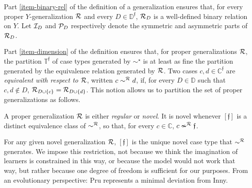 \documentclass[12pt,a4paper,twoside]{article}
\newcommand{\novel}{\mathfrak f}
\newcommand{\Ext}{\operatorname{ext}}
\newcommand{\preceqb}{\mathbin{\preceq}}
\newcommand{\ext}{\mathrel{\mc R}}
\newcommand{\sext}{\mathrel{\mc P}}
\newcommand{\next}{\mathrel{\mc I}}
\newcommand{\supext}{{\ext}}
\newcommand{\extb}{\mathbin{\mc R}}
\newcommand{\mbbd}{{\mathds D}}
\newcommand{\mbbdp}{{\mathds D^{\novel}}}
\newcommand{\mbbc}{{\mathds C}}
\newcommand{\mbbcp}{{\mathds C^{\novel}}}
\newcommand{\mbbtp}{{\mathds{T}^\novel}}
\begin{document}
Part \ref{item-binary-rel} of the definition of a {generalization} ensures that, for
every proper $Y$-{generalization} $\ext$ and every $D\in \mbbdp$, $\ext_{D}$ is a
well-defined binary relation on $Y$.  Let $\next_{D}$ and $\sext_{D}$
respectively denote the symmetric and asymmetric parts of $\ext_{D}$.


Part \ref{item-dimension} of the definition ensures that, for proper {generalization}s
$\ext$, the partition $\mbbtp$ of case types generated by $\sim^{\star}$ is at
least as fine the partition generated by the equivalence relation generated by
$\ext$. Two cases $c,d \in \mbbcp$ are \emph{equivalent with respect to
  $\ext$}, written $c \sim^{\extb} d$, if, for every $D \in \mbbd$ such
that $c,d \notin D$, $\extb _ {D \cup \{c\}} = \extb _ {D \cup\{d\}}$.
This notion allows us to partition the set of proper {generalization}s as follows.


\begin{definition*}\label{def-novel}

  A proper {generalization} $\ext$ is either \emph{regular} or \emph{novel}.  It is
  novel whenever $[\novel]$ is a distinct equivalence class of $\sim^{\supext}$,
  so that, for every $c \in \mbbc$, $c \nsim^\supext \novel$.

\end{definition*}



For any given novel {generalization} $\ext$, $[\novel]$ is the unique novel case type
that $\sim^{\extb}$ generates.  We impose this restriction, not because we
think the imagination of learners is constrained in this way, or because the
model would not work that way, but rather because one degree of freedom is
sufficient for our purposes. From an evolutionary perspective: {Pru} represents
a minimal deviation from Inny.
\end{document}
